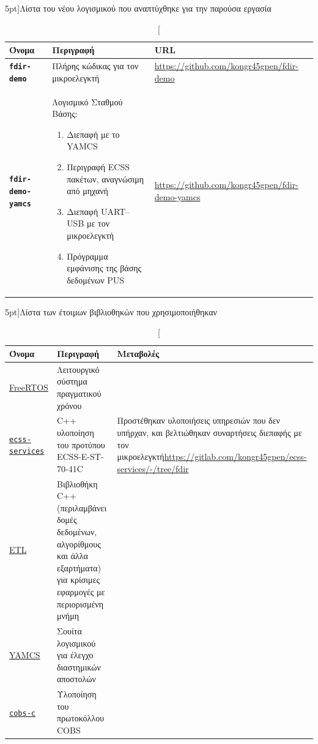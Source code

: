 \documentclass[a4paper,nobib]{tufte-book}
\begin{document}
\begin{table}[h]
	\centering
	\caption[][5pt]{Λίστα του νέου λογισμικού που αναπτύχθηκε για την παρούσα εργασία}
	\label{tab:new_software}
	\begin{tabularx}{\textwidth}{@{}lXp{6cm}@{}}
		\toprule
		Όνομα & Περιγραφή & URL \\ \midrule
		\textbf{\texttt{fdir-demo}} & Πλήρης κώδικας για τον μικροελεγκτή  & \small \url{https://github.com/kongr45gpen/fdir-demo} \\
		\textbf{\texttt{fdir-demo-yamcs}} & Λογισμικό Σταθμού Βάσης: \begin{enumerate}
			\item Διεπαφή με το \acs{YAMCS}
			\item Περιγραφή \acs{ECSS} πακέτων, αναγνώσιμη από μηχανή
			\item Διεπαφή \acs{UART}--\acs{USB} με τον μικροελεγκτή
			\item Πρόγραμμα εμφάνισης της βάσης δεδομένων \acs{PUS}\vspace*{-2ex}
			\end{enumerate} & \small \url{https://github.com/kongr45gpen/fdir-demo-yamcs} \\
		\bottomrule
	\end{tabularx}
\end{table}

\begin{table}[h]
	\centering
	\vspace{2em}
	\caption[][5pt]{Λίστα των έτοιμων βιβλιοθηκών που χρησιμοποιήθηκαν}
	\label{tab:old_software}
	\begin{tabularx}{\textwidth}{@{}lp{6cm}X@{}}
		\toprule
		Όνομα & Περιγραφή & Μεταβολές \\ \midrule
		\href{https://www.freertos.org/}{FreeRTOS} & Λειτουργικό σύστημα πραγματικού χρόνου & \\
		\href{https://gitlab.com/acubesat/obc/ecss-services}{\texttt{ecss-services}} & C++ υλοποίηση του προτύπου ECSS-E-ST-70-41C %
		& \small
		Προστέθηκαν υλοποιήσεις υπηρεσιών που δεν υπήρχαν, και βελτιώθηκαν συναρτήσεις διεπαφής με τον μικροελεγκτή\newline\small\url{https://gitlab.com/kongr45gpen/ecss-services/-/tree/fdir}
		 \\
		 \href{https://www.etlcpp.com/}{\acs{ETL}}  & Βιβλιοθήκη C++ (περιλαμβάνει δομές δεδομένων, αλγορίθμους και άλλα εξαρτήματα) για κρίσιμες εφαρμογές με περιορισμένη μνήμη &
		 \\
 		\href{https://github.com/yamcs/yamcs}{\acs{YAMCS}}  & Σουίτα λογισμικού για έλεγχο διαστημικών αποστολών& %
 		\\
		\href{https://github.com/cmcqueen/cobs-c}{\texttt{cobs-c}}  & Υλοποίηση του πρωτοκόλλου \ac{COBS} %
		 & \\
		\bottomrule
	\end{tabularx}
\end{table}
\end{document}
